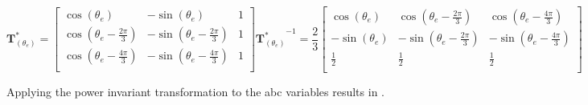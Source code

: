 \begin{subequations}
	\begin{equation}
		\mathbf{T}^*_{(\theta_e)} =
		\begin{bmatrix}
			\cos{\left(\theta_e\right)}                & -\sin{\left(\theta_e\right)}                & 1 \\
			\cos{\left(\theta_e-\frac{2\pi}{3}\right)} & -\sin{\left(\theta_e-\frac{2\pi}{3}\right)} & 1 \\
			\cos{\left(\theta_e-\frac{4\pi}{3}\right)} & -\sin{\left(\theta_e-\frac{4\pi}{3}\right)} & 1 \\
		\end{bmatrix}
	\end{equation}
	\begin{equation}
		{\mathbf{T}^*_{(\theta_e)}}^{-1} = \frac{2}{3}
		\begin{bmatrix}
			\cos{\left(\theta_e\right)}  & \cos{\left(\theta_e-\frac{2\pi}{3}\right)}  & \cos{\left(\theta_e-\frac{4\pi}{3}\right)}  \\
			-\sin{\left(\theta_e\right)} & -\sin{\left(\theta_e-\frac{2\pi}{3}\right)} & -\sin{\left(\theta_e-\frac{4\pi}{3}\right)} \\
			\frac{1}{2}                  & \frac{1}{2}                                 & \frac{1}{2}                                 \\
		\end{bmatrix}
	\end{equation}
	\label{eq:blondel_park_amplitude_invariant}%
\end{subequations}

Applying the power invariant transformation to the abc variables results in .

